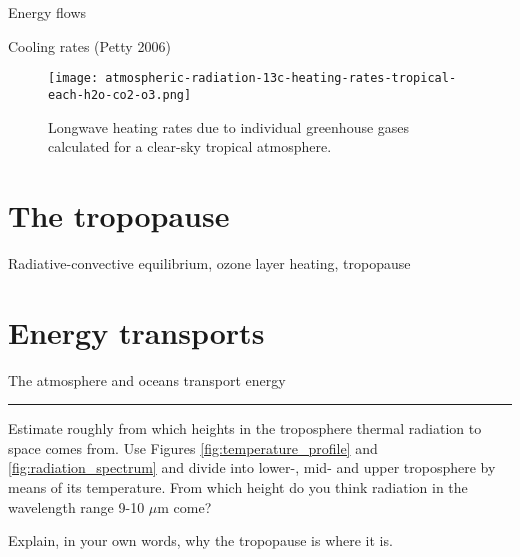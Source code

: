 \documentclass[12pt]{book}
\begin{document}
Energy flows

Cooling rates (Petty 2006)

\begin{figure}
\begin{center}
\texttt{[image: atmospheric-radiation-13c-heating-rates-tropical-each-h2o-co2-o3.png]}
\end{center}
\caption{ Longwave heating rates due to individual greenhouse gases calculated for a clear-sky tropical atmosphere.  } 
\label{fig:radiative_cooling}
\end{figure}

\section{The tropopause}

Radiative-convective equilibrium, ozone layer heating, tropopause

\section{Energy transports}
The atmosphere and oceans transport energy

\vspace{1 cm}
\hrule
{\setlength{\parindent}{0cm}
\begin{exercise}
Estimate roughly from which heights in the troposphere thermal radiation to space comes from. Use Figures \ref{fig:temperature_profile} and \ref{fig:radiation_spectrum} and divide into lower-, mid- and upper troposphere by means of its temperature. From which height do you think radiation in the wavelength range 9-10 $\mu$m come?
\end{exercise}

\begin{exercise}
Explain, in your own words, why the tropopause is where it is.
\end{exercise}
}

%
%
%
% 
%
\end{document}
